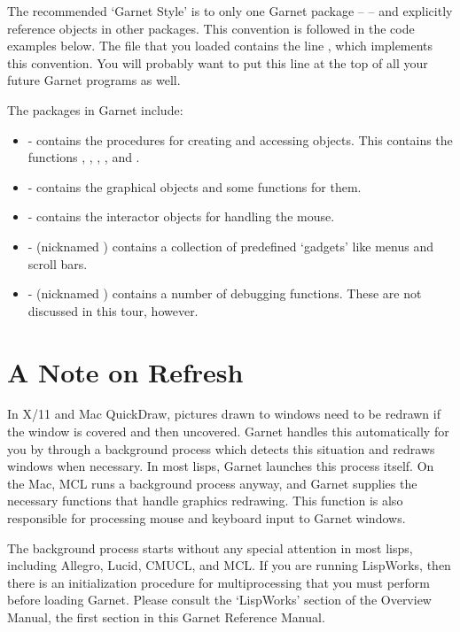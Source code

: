 The recommended `Garnet Style' is to  only one
Garnet package --  -- and explicitly reference objects in other
packages.  This convention is followed in the code examples below.
The file  that you loaded contains the line
, which implements this convention.  You will
probably want to put this line at the top of all your future Garnet
programs as well.

The packages in Garnet include:
\begin{itemize}
\item {} - contains the procedures for creating and accessing objects.  This
contains the functions , , ,
, and .

\item {} - contains the graphical objects and some functions for them.

\item {} - contains the interactor objects for handling the mouse.

\item {} - (nicknamed ) contains a collection of predefined
`gadgets' like menus and scroll bars.

\item {} - (nicknamed ) contains a number of debugging
functions.  These are not discussed in this tour, however.
\end{itemize}


\section{A Note on Refresh}
In X/11 and Mac QuickDraw, pictures drawn to windows need to be
redrawn if the window is covered and then uncovered.  Garnet handles
this automatically for you by through a background process
which detects this situation and redraws windows when necessary.
In most lisps, Garnet launches this  process
itself.  On the Mac, MCL runs a background process anyway, and Garnet
supplies the necessary functions that handle graphics redrawing.
This function is also responsible for processing
mouse and keyboard input to Garnet windows.

The  background process starts without any special
attention in most lisps, including Allegro, Lucid, CMUCL, and MCL.  If
you are running LispWorks, then there is an initialization procedure
for multiprocessing that you must perform before loading Garnet.
Please consult the `LispWorks' section of the Overview Manual, the
first section in this Garnet Reference Manual.

